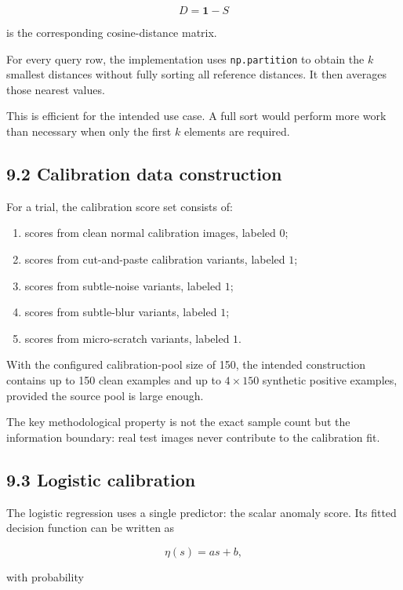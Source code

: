 \documentclass[
  11pt,
]{article}
\providecommand{\tightlist}{%
  \setlength{\itemsep}{0pt}\setlength{\parskip}{0pt}}
\begin{document}
\[
D=\mathbf{1}-S
\]

is the corresponding cosine-distance matrix.

For every query row, the implementation uses \texttt{np.partition} to
obtain the \(k\) smallest distances without fully sorting all reference
distances. It then averages those nearest values.

This is efficient for the intended use case. A full sort would
perform more work than necessary when only the first \(k\) elements are
required.

\subsection{9.2 Calibration data
construction}\label{calibration-data-construction}

For a trial, the calibration score set consists of:

\begin{enumerate}
\def\labelenumi{\arabic{enumi}.}
\tightlist
\item
  scores from clean normal calibration images, labeled \(0\);
\item
  scores from cut-and-paste calibration variants, labeled \(1\);
\item
  scores from subtle-noise variants, labeled \(1\);
\item
  scores from subtle-blur variants, labeled \(1\);
\item
  scores from micro-scratch variants, labeled \(1\).
\end{enumerate}

With the configured calibration-pool size of 150, the intended
construction contains up to 150 clean examples and up to \(4\times150\)
synthetic positive examples, provided the source pool is large enough.

The key methodological property is not the exact sample count but the
information boundary: real test images never contribute to the
calibration fit.

\subsection{9.3 Logistic calibration}\label{logistic-calibration}

The logistic regression uses a single predictor: the scalar anomaly
score. Its fitted decision function can be written as

\[
\eta(s)=as+b,
\]

with probability
\end{document}
